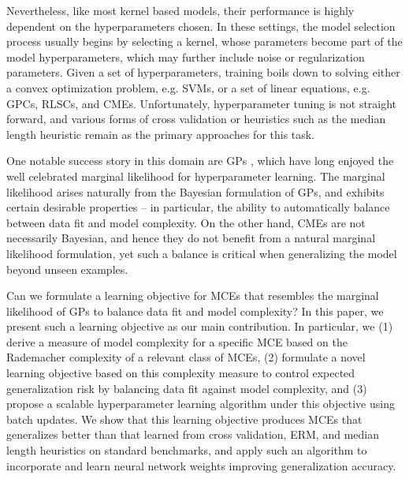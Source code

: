 \documentclass[twoside]{article}
\begin{document}
		
		Nevertheless, like most kernel based models, their performance is highly dependent on the hyperparameters chosen. In these settings, the model selection process usually begins by selecting a kernel, whose parameters become part of the model hyperparameters, which may further include noise or regularization parameters. Given a set of hyperparameters, training boils down to solving either a convex optimization problem, e.g. \glspl{SVM}, or a set of linear equations, e.g. \glspl{GPC}, \glspl{RLSC}, and \glspl{CME}. Unfortunately, hyperparameter tuning is not straight forward, and various forms of cross validation \citep{song2013kernel} or heuristics such as the median length heuristic \citep{damien2017asymptotic, muandet2016kernel} remain as the primary approaches for this task.
		
		
		One notable success story in this domain are \gls{GPs} \citep{rasmussen2006gaussian}, which have long enjoyed the well celebrated marginal likelihood for hyperparameter learning. The marginal likelihood arises naturally from the Bayesian formulation of \gls{GPs}, and exhibits certain desirable properties -- in particular, the ability to automatically balance between data fit and model complexity. On the other hand, \glspl{CME} are not necessarily Bayesian, and hence they do not benefit from a natural marginal likelihood formulation, yet such a balance is critical when generalizing the model beyond unseen examples.
		
		
		Can we formulate a learning objective for \glspl{MCE} that resembles the marginal likelihood of \gls{GPs} to balance data fit and model complexity? In this paper, we present such a learning objective as our main contribution. In particular, we (1) derive a measure of model complexity for a specific \gls{MCE} based on the Rademacher complexity of a relevant class of \glspl{MCE}, (2) formulate a novel learning objective based on this complexity measure to control expected generalization risk by balancing data fit against model complexity, and (3) propose a scalable hyperparameter learning algorithm under this objective using batch updates. We show that this learning objective produces \glspl{MCE} that generalizes better than that learned from cross validation, \gls{ERM}, and median length heuristics on standard benchmarks, and apply such an algorithm to incorporate and learn neural network weights improving generalization accuracy. %
		
\end{document}
